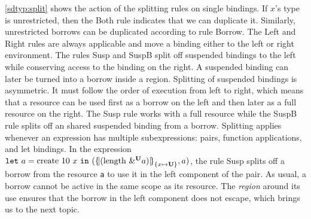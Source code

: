 \cref{sdtyp:split} shows the action of the splitting rules on single
bindings. If $x$'s type is unrestricted, then
the {\sc Both} rule indicates that we can duplicate it.
Similarly, unrestricted borrows can be duplicated according to rule
{\sc Borrow}.
The {\sc Left} and {\sc Right} rules are always applicable and move a binding
either to the left or right environment.
The rules {\sc Susp} and {\sc SuspB} split off suspended bindings to
the left while conserving access to the binding on the right.
A suspended binding can later be turned
into a borrow inside a region. Splitting of suspended bindings is
asymmetric. It must follow the order of execution from left to right,
which means that a resource can be used first as a borrow on the left
and then later as a full resource on the right. The {\sc Susp} rule
works with a full resource while the {\sc SuspB}
rule splits off an shared suspended binding from a borrow.
%
Splitting applies whenever an
expression has multiple subexpressions:  pairs, function applications,
and let bindings. In the
expression
$\letin{a}{\text{create}\ 10\ x}
{\introPair{\region[{}]{\Sone x\IBORROW}{\app{\text{length}}{\borrow[\IBORROW]{a}}}}{a}}$,
the rule {\sc Susp} splits off a borrow from  the resource
\lstinline/a/ to use it in the left component of the pair.
As usual, a borrow cannot be active in the same scope as its resource.
The \emph{region} around its use ensures that the borrow in the left component does not
escape, which brings us to the next topic.



